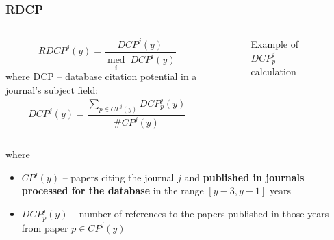 \documentclass{beamer}
\begin{document}
\begin{frame}
    \frametitle{RDCP}
    \begin{columns}[T]
        \begin{column}{.5\textwidth}
            \[
                RDCP^j(y) = \frac{DCP^j(y)}{\operatorname*{med}\limits_{i} \; {DCP^i(y)}}
            \]
            where DCP -- database citation
            potential in a journal’s subject field:
            \[
                DCP^j(y) = \frac{\sum\limits_{p \in CP^j(y)} DCP^j_p(y)}{\# CP^j(y)}
            \]
        \end{column}
        \begin{column}{.5\textwidth}
            \begin{figure}[ht]
                \caption{Example of $DCP^j_p$ calculation}
            \end{figure}
        \end{column}
    \end{columns}
    where
    \begin{itemize}
        \item $CP^j(y)$ -- papers  citing the
              journal $j$ and \textbf{published in
                  journals processed for the
                  database} in the range $[y-3, y-1]$ years
        \item $DCP^j_p(y)$ -- number of references to the
              papers published in those years
              from paper $p \in CP^j(y)$
    \end{itemize}
\end{frame}
\end{document}
